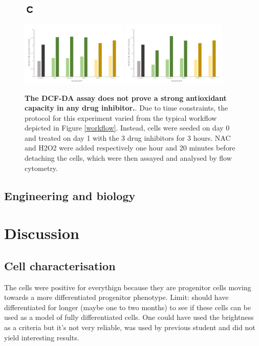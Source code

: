 \documentclass[onecolumn,10pt]{asme2ej}
\begin{document}
\begin{figure}[h]
	\includegraphics[width=0.05\textwidth]{figures/c}
		
		
	\includegraphics[width=0.45\textwidth]{figures/dcf_vm-}
	\includegraphics[width=0.45\textwidth]{figures/dcf_vm+}
	
	
	\caption{\textbf{The DCF-DA assay does not prove a strong antioxidant capacity in any drug inhibitor.}.
		Due to time constraints, the protocol for this experiment varied from the typical workflow depicted in Figure \ref*{workflow}. Instead, cells were seeded on day 0 and treated on day 1 with the 3 drug inhibitors for 3 hours. NAC and H2O2 were added respectively one hour and 20 minutes before detaching the cells, which were then assayed and analysed by flow cytometry.}
	\label{dcf}
\end{figure}

\subsection{Engineering and biology}


\section{Discussion}
\subsection{Cell characterisation}
The cells were positive for everythign because they are progenitor cells moving towards a more differentiated progenitor phenotype. Limit: should have differentiated for longer (maybe one to two months) to see if these cells can be used as a model of fully differentiated cells. One could have used the brightness as a criteria but it's not very reliable, was used by previous student and did not yield interesting results. 
\end{document}
